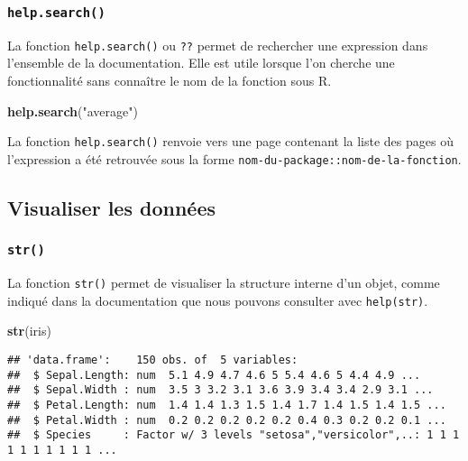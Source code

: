 \documentclass[]{book}
\newenvironment{Shaded}{\begin{snugshade}}{\end{snugshade}}
\newcommand{\KeywordTok}[1]{\textcolor[rgb]{0.13,0.29,0.53}{\textbf{#1}}}
\newcommand{\StringTok}[1]{\textcolor[rgb]{0.31,0.60,0.02}{#1}}
\newcommand{\NormalTok}[1]{#1}
\theoremstyle{definition}
\theoremstyle{definition}
\theoremstyle{definition}
\theoremstyle{remark}
\begin{document}
\subsubsection{\texorpdfstring{\texttt{help.search()}}{help.search()}}\label{l015helpsearch}

La fonction \texttt{help.search()} ou \texttt{??} permet de rechercher
une expression dans l'ensemble de la documentation. Elle est utile
lorsque l'on cherche une fonctionnalité sans connaître le nom de la
fonction sous R.

\begin{Shaded}
\begin{Highlighting}[]
\KeywordTok{help.search}\NormalTok{(}\StringTok{"average"}\NormalTok{)}
\end{Highlighting}
\end{Shaded}

La fonction \texttt{help.search()} renvoie vers une page contenant la
liste des pages où l'expression a été retrouvée sous la forme
\texttt{nom-du-package::nom-de-la-fonction}.

\subsection{Visualiser les données}\label{visualiser-les-donnees}

\subsubsection{\texorpdfstring{\texttt{str()}}{str()}}\label{l015str}

La fonction \texttt{str()} permet de visualiser la structure interne
d'un objet, comme indiqué dans la documentation que nous pouvons
consulter avec \texttt{help(str)}.

\begin{Shaded}
\begin{Highlighting}[]
\KeywordTok{str}\NormalTok{(iris)}
\end{Highlighting}
\end{Shaded}

\begin{verbatim}
## 'data.frame':    150 obs. of  5 variables:
##  $ Sepal.Length: num  5.1 4.9 4.7 4.6 5 5.4 4.6 5 4.4 4.9 ...
##  $ Sepal.Width : num  3.5 3 3.2 3.1 3.6 3.9 3.4 3.4 2.9 3.1 ...
##  $ Petal.Length: num  1.4 1.4 1.3 1.5 1.4 1.7 1.4 1.5 1.4 1.5 ...
##  $ Petal.Width : num  0.2 0.2 0.2 0.2 0.2 0.4 0.3 0.2 0.2 0.1 ...
##  $ Species     : Factor w/ 3 levels "setosa","versicolor",..: 1 1 1 1 1 1 1 1 1 1 ...
\end{verbatim}
\end{document}
